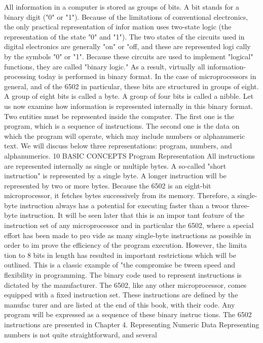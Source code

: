 All information in a computer is stored as groups of bits. A bit
stands for a binary digit ("0" or "1"). Because of the limitations
of conventional electronics, the only practical representation of infor
mation uses two-state logic (the representation of the state "0" and
"1"). The two states of the circuits used in digital electronics
are generally "on" or "off, and these are represented logi
cally by the symbols "0" or "1". Because these circuits are
used to implement "logical" functions, they are called "binary
logic." As a result, virtually all information-processing today is
performed in binary format. In the case of microprocessors in
general, and of the 6502 in particular, these bits are structured in
groups of eight. A group of eight bits is called a byte. A group of
four bits is called a nibble.
Let us now examine how information is represented internally in
this binary format. Two entities must be represented inside the
computer. The first one is the program, which is a sequence of
instructions. The second one is the data on which the program will
operate, which may include numbers or alphanumeric text. We will
discuss below three representations: program, numbers, and alphanumerics.
10
BASIC CONCEPTS
Program Representation
All instructions are represented internally as single or multiple
bytes. A so-called "short instruction" is represented by a single
byte. A longer instruction will be represented by two or more
bytes. Because the 6502 is an eight-bit microprocessor, it fetches
bytes successively from its memory. Therefore, a single-byte
instruction always has a potential for executing faster than a twoor
three-byte instruction. It will be seen later that this is an impor
tant feature of the instruction set of any microprocessor and in
particular the 6502, where a special effort has been made to pro
vide as many single-byte instructions as possible in order to im
prove the efficiency of the program execution. However, the limita
tion to 8 bits in length has resulted in important restrictions which
will be outlined. This is a classic example of "the compromise be
tween speed and flexibility in programming. The binary code used
to represent instructions is dictated by the manufacturer. The
6502, like any other microprocessor, comes equipped with a fixed
instruction set. These instructions are defined by the manufac
turer and are listed at the end of this book, with their code. Any
program will be expressed as a sequence of these binary instruc
tions. The 6502 instructions are presented in Chapter 4.
Representing Numeric Data
Representing numbers is not quite straightforward, and several
